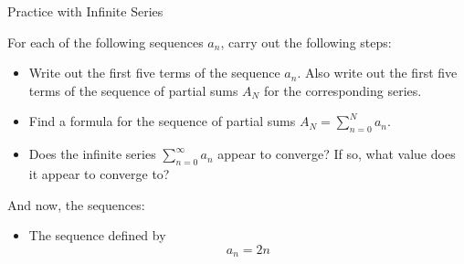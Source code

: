 \begin{exercise}{Practice with Infinite Series \Coffeecup \Coffeecup \Coffeecup}

For each of the following sequences $a_n$, carry out the following steps:

\begin{itemize}

\item Write out the first five terms of the sequence $a_n$.  Also write out the first five terms of the sequence of partial sums $A_N$ for the corresponding series.

\item  Find a formula for the sequence of partial sums $A_N=\sum_{n=0}^N a_n$.

\item Does the infinite series $\sum_{n=0}^\infty a_n$ appear to converge?  If so, what value does it appear to converge to?

\end{itemize}

And now, the sequences:

\begin{itemize}

\item The sequence defined by $$a_n=2n$$
\end{itemize}
\end{exercise}
